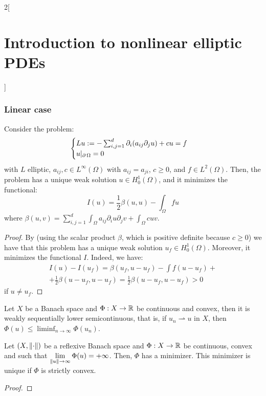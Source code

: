 \documentclass[../../../main_math.tex]{subfiles}
\begin{document}
\begin{multicols}{2}[\section{Introduction to nonlinear elliptic PDEs}]
  \subsubsection{Linear case}
  \begin{proposition}
    Consider the problem:
    \begin{equation}\label{INEPDE:var_linear_problem}
      \begin{cases}
        Lu:=-\sum_{i,j=1}^d \partial_i(a_{ij}\partial_j u)+cu=f \\
        u|_{\operatorname{\partial}{\Omega}}=0
      \end{cases}
    \end{equation}
    with $L$ elliptic, $a_{ij},c\in L^\infty(\Omega)$ with $a_{ij}= a_{ji}$, $c\geq 0$, and $f\in L^2(\Omega)$. Then, the problem has a unique weak solution $u\in H_0^1(\Omega)$, and it minimizes the functional:
    $$
      I(u)=\frac{1}{2}\beta(u,u)-\int_\Omega fu
    $$
    where $\displaystyle\beta(u,v)=\sum_{i,j=1}^d\int_\Omega a_{ij}\partial_i u\partial_j v + \int_\Omega cuv$.
  \end{proposition}
  \begin{proof}
    By  (using the scalar product $\beta$, which is positive definite because $c\geq 0$) we have that this problem has a unique weak solution $u_f\in H_0^1(\Omega)$. Moreover, it minimizes the functional $I$. Indeed, we have:
    \begin{multline*}
      I(u)-I(u_f)=\beta(u_f,u-u_f)-\int f(u-u_f)+\\
      +\frac{1}{2}\beta(u-u_f,u-u_f)= \frac{1}{2} \beta(u-u_f,u-u_f)>0
    \end{multline*}
    if $u\ne u_f$.
  \end{proof}
  \begin{lemma}\label{INEPDE:optimization}
    Let $X$ be a Banach space and $\Phi:X\to \mathbb{R}$ be continuous and convex, then it is weakly sequentially lower semicontinuous, that is, if $u_n\rightharpoonup u$ in $X$, then $\displaystyle\Phi(u)\leq \liminf_{n\to\infty}\Phi(u_n)$.
  \end{lemma}
  \begin{theorem}
    Let $(X,\left\|\cdot\right\|)$ be a reflexive Banach space and $\Phi:X\to \mathbb{R}$ be continuous, convex and such that $\displaystyle \lim_{\left\|u\right\|\to\infty}\Phi(u)=+\infty$. Then, $\Phi$ has a minimizer. This minimizer is unique if $\Phi$ is strictly convex.
  \end{theorem}
  \begin{proof}

\end{proof}
\end{multicols}
\end{document}
